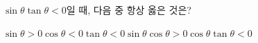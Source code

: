 $\sin\theta\tan\theta<0$일 때, 다음 중 항상 옳은 것은?
\begin{choices32}{$\sin\theta>0$}{$\cos\theta<0$}{$\tan\theta<0$}{$\sin\theta\cos\theta>0$}{$\cos\theta\tan\theta<0$}\end{choices32}
